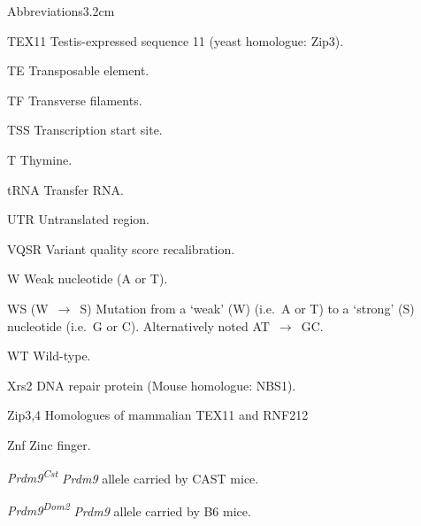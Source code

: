 \begin{mclistof}{Abbreviations}{3.2cm}
\item[TEX11] Testis-expressed sequence 11 (yeast homologue: Zip3).
\item[TE] Transposable element.
\item[TF] Transverse filaments.
\item[TSS] Transcription start site.
\item[T] Thymine.
\item[tRNA] Transfer RNA\@.
\item[UTR] Untranslated region.
\item[VQSR] Variant quality score recalibration.
\item[W] Weak nucleotide (A or T).
\item[WS (W~$\rightarrow$~S)] Mutation from a ‘weak’ (W) (i.e.\ A or T) to a ‘strong’ (S) nucleotide (i.e.\ G or C). Alternatively noted AT~$\rightarrow$~GC\@.
\item[WT] Wild-type.
\item[Xrs2] DNA repair protein (Mouse homologue: NBS1).
\item[Zip3,4] Homologues of mammalian TEX11 and RNF212
\item[Znf] Zinc finger.
\item[\textit{Prdm9\textsuperscript{Cst}}] \textit{Prdm9} allele carried by CAST mice.
\item[\textit{Prdm9\textsuperscript{Dom2}}] \textit{Prdm9} allele carried by B6 mice.


\end{mclistof}








